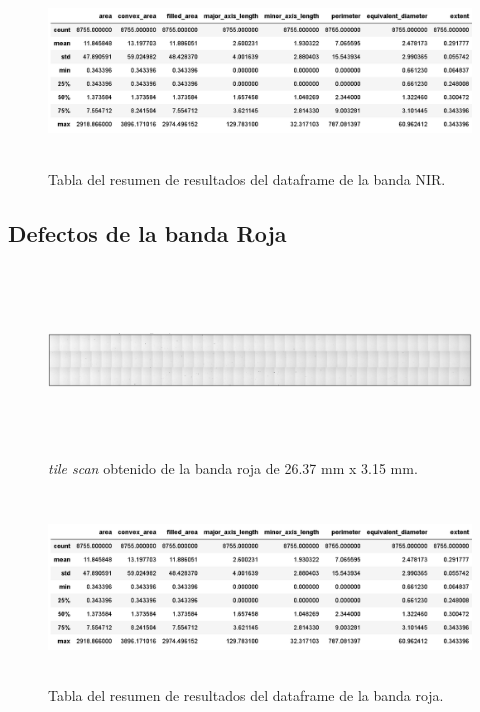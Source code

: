 \documentclass{ctuthesis}
\begin{document}
\begin{figure}[H]
	\centering
	\includegraphics[width=1.0\textwidth,height= 5.0cm]{Figs/resultados_defectos/tabla_nir.png}
	\caption{Tabla del resumen de resultados del dataframe de la banda NIR.}
	\label{fig:bgcel}
\end{figure}

\singlespacing
\subsection*{Defectos de la banda Roja}


\begin{figure}[H]
	\centering
	\includegraphics[width=1.0\textwidth,height= 5.0cm]{Figs/resultados_defectos/banda_roja.png}
	\caption{\textit{tile scan} obtenido de la banda roja de 26.37 mm x 3.15 mm.}
	\label{fig:bgcel}
\end{figure}


\begin{figure}[H]
	\centering
	\includegraphics[width=1.0\textwidth,height= 5.0cm]{Figs/resultados_defectos/tabla_NIR.png}
	\caption{Tabla del resumen de resultados del dataframe de la banda roja.}
	\label{fig:bgcel}
\end{figure}
\end{document}
